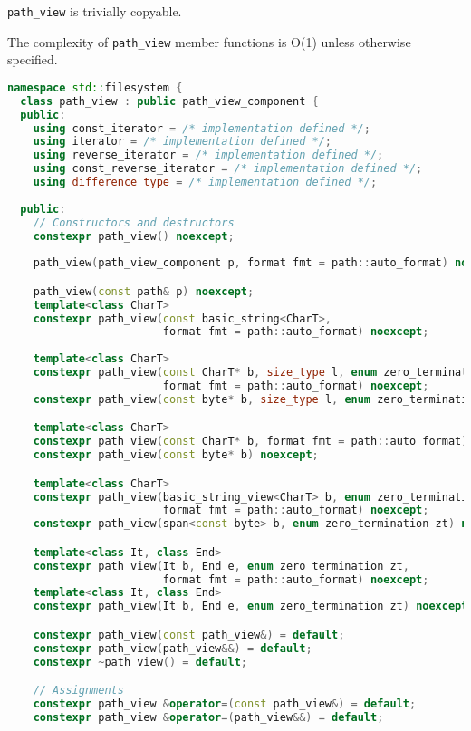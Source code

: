 \documentclass[11pt]{article}
\newcommand{\code}[2][cpp]{\lstinline[language=#1,basicstyle=\small\ttfamily]{#2}}
\begin{document}
\code{path_view} is trivially copyable.

The complexity of \code{path_view} member functions is O(1) unless otherwise specified.

\begin{lstlisting}[language=cpp]
namespace std::filesystem {
  class path_view : public path_view_component {
  public:
    using const_iterator = /* implementation defined */;
    using iterator = /* implementation defined */;
    using reverse_iterator = /* implementation defined */;
    using const_reverse_iterator = /* implementation defined */;
    using difference_type = /* implementation defined */;
    
  public:
    // Constructors and destructors
    constexpr path_view() noexcept;
    
    path_view(path_view_component p, format fmt = path::auto_format) noexcept;

    path_view(const path& p) noexcept;
    template<class CharT>
    constexpr path_view(const basic_string<CharT>,
                        format fmt = path::auto_format) noexcept;
                        
    template<class CharT>
    constexpr path_view(const CharT* b, size_type l, enum zero_termination zt,
                        format fmt = path::auto_format) noexcept;
    constexpr path_view(const byte* b, size_type l, enum zero_termination zt) noexcept;

    template<class CharT>
    constexpr path_view(const CharT* b, format fmt = path::auto_format) noexcept;
    constexpr path_view(const byte* b) noexcept;

    template<class CharT>
    constexpr path_view(basic_string_view<CharT> b, enum zero_termination zt,
                        format fmt = path::auto_format) noexcept;
    constexpr path_view(span<const byte> b, enum zero_termination zt) noexcept;

    template<class It, class End>
    constexpr path_view(It b, End e, enum zero_termination zt,
                        format fmt = path::auto_format) noexcept;
    template<class It, class End>
    constexpr path_view(It b, End e, enum zero_termination zt) noexcept;

    constexpr path_view(const path_view&) = default;
    constexpr path_view(path_view&&) = default;
    constexpr ~path_view() = default;

    // Assignments
    constexpr path_view &operator=(const path_view&) = default;
    constexpr path_view &operator=(path_view&&) = default;
    

\end{lstlisting}
\end{document}
